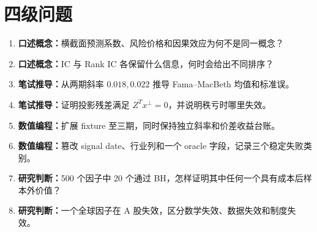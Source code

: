 \section{四级问题}
\begin{enumerate}[leftmargin=*]
  \item \textbf{口述概念：}横截面预测系数、风险价格和因果效应为何不是同一概念？
  \item \textbf{口述概念：}IC 与 Rank IC 各保留什么信息，何时会给出不同排序？
  \item \textbf{笔试推导：}从两期斜率 $0.018,0.022$ 推导 Fama--MacBeth 均值和标准误。
  \item \textbf{笔试推导：}证明投影残差满足 $Z^Tx^\perp=0$，并说明秩亏时哪里失效。
  \item \textbf{数值编程：}扩展 fixture 至三期，同时保持独立斜率和价差收益台账。
  \item \textbf{数值编程：}篡改 signal date、行业列和一个 oracle 字段，记录三个稳定失败类别。
  \item \textbf{研究判断：}500 个因子中 20 个通过 BH，怎样证明其中任何一个具有成本后样本外价值？
  \item \textbf{研究判断：}一个全球因子在 A 股失效，区分数学失效、数据失效和制度失效。
\end{enumerate}
